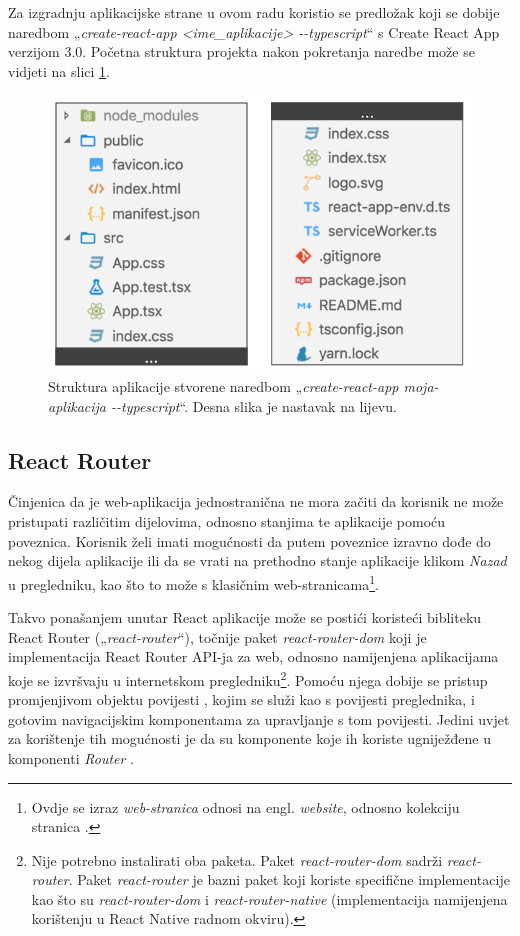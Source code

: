 \documentclass[times, utf8, diplomski, numeric]{fer}
\newcommand{\razmakp}{\vspace{18pt}}
\newcommand{\razmaks}{\vspace{10pt}}
\begin{document}
\razmakp

Za izgradnju aplikacijske strane u ovom radu koristio se predložak koji se dobije naredbom „\emph{create-react-app <ime\_aplikacije> -{}-typescript}“ s Create React App verzijom 3.0.
Početna struktura projekta nakon pokretanja naredbe može se vidjeti na slici \ref{fig:cra}.

\begin{figure}[!htb] %
    \centering
    \includegraphics[width=12cm]{images/cra.png}
    \caption{Struktura aplikacije stvorene naredbom „\emph{create-react-app moja-aplikacija -{}-typescript}“. Desna slika je nastavak na lijevu.}
    \label{fig:cra}
    \razmaks
\end{figure}


\razmaks
\subsection{React Router}

Činjenica da je web-aplikacija jednostranična ne mora začiti da korisnik ne može pristupati različitim dijelovima, odnosno stanjima te aplikacije pomoću poveznica.
Korisnik želi imati mogućnosti da putem poveznice izravno dođe do nekog dijela aplikacije ili da se vrati na prethodno stanje aplikacije klikom \emph{Nazad} u pregledniku, kao što to može s klasičnim web-stranicama\footnote{Ovdje se izraz \emph{web-stranica} odnosi na engl. \emph{website}, odnosno kolekciju stranica .}.

Takvo ponašanjem unutar React aplikacije može se postići koristeći bibliteku React Router („\emph{react-router}“), točnije paket \emph{react-router-dom} koji je implementacija React Router API-ja za web, odnosno namijenjena aplikacijama koje se izvršvaju u internetskom pregledniku\footnote{
    Nije potrebno instalirati oba paketa.
    Paket \emph{react-router-dom} sadrži \emph{react-router}.
    Paket \emph{react-router} je bazni paket koji koriste specifične implementacije kao što su \emph{react-router-dom} i \emph{react-router-native} (implementacija namijenjena korištenju u React Native radnom okviru).
}.
Pomoću njega dobije se pristup promjenjivom objektu povijesti , kojim se služi kao s povijesti preglednika, i gotovim navigacijskim komponentama za upravljanje s tom povijesti.
Jedini uvjet za korištenje tih mogućnosti je da su komponente koje ih koriste ugniježđene u komponenti \emph{Router} \citep{react_router}.
\end{document}
